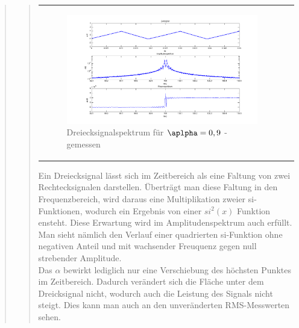 \begin{quote}
\begin{quote}
\begin{center}
\begin{tabular}{ll}
\begin{minipage}{0.6\textwidth}
                    \begin{figure}[H]
                        \label{fig:}            
                        \includegraphics[scale=0.3]{./Bilder/drei_alpha9_-_gemessen.png} %
                        \caption{Dreiecksignalspektrum für $\aplpha = 0,9$ - gemessen}
                    \end{figure}                
                 \vspace{-1.5em}

                \end{minipage}

            \end{tabular}
            \end{center}

            
            Ein Dreiecksignal lässt sich im Zeitbereich als eine Faltung von
            zwei Rechtecksignalen darstellen. Überträgt man diese Faltung in den
            Frequenzbereich, wird daraus eine Multiplikation zweier
            si-Funktionen, wodurch ein Ergebnis von einer $si^2(x)$ Funktion
            ensteht. Diese Erwartung wird im Amplitudenspektrum auch erfüllt.
            Man sieht nämlich den Verlauf einer quadrierten si-Funktion ohne
            negativen Anteil und mit wachsender Freuquenz gegen null strebender
            Amplitude.\\
            
            Das $\alpha$ bewirkt lediglich nur eine Verschiebung des höchsten
            Punktes im Zeitbereich. Dadurch verändert sich die Fläche unter dem
            Dreicksignal nicht, wodurch auch die Leistung des Signals nicht
            steigt. Dies kann man auch an den unveränderten RMS-Messwerten
            sehen.
           

\end{quote}
\end{quote}
